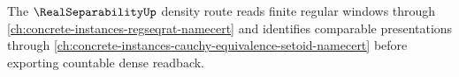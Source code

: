 The $\RealSeparabilityUp$ density route reads finite regular windows through \autoref{ch:concrete-instances-regseqrat-namecert} and identifies comparable presentations through \autoref{ch:concrete-instances-cauchy-equivalence-setoid-namecert} before exporting countable dense readback.
